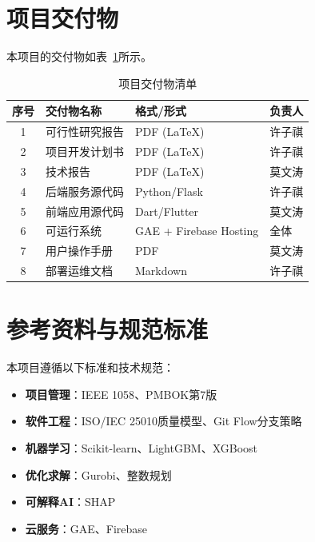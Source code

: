 \section{项目交付物}

本项目的交付物如表~\ref{tab:deliverables}所示。

\begin{table}[htbp]
    \centering
    \caption{项目交付物清单}
    \label{tab:deliverables}
    \begin{tabular}{clll}
        \toprule
        \textbf{序号} & \textbf{交付物名称} & \textbf{格式/形式}         & \textbf{负责人} \\
        \midrule
        1           & 可行性研究报告        & PDF (LaTeX)            & 许子祺          \\
        2           & 项目开发计划书        & PDF (LaTeX)            & 许子祺          \\
        3           & 技术报告           & PDF (LaTeX)            & 莫文涛          \\
        4           & 后端服务源代码        & Python/Flask           & 许子祺          \\
        5           & 前端应用源代码        & Dart/Flutter           & 莫文涛          \\
        6           & 可运行系统          & GAE + Firebase Hosting & 全体           \\
        7           & 用户操作手册         & PDF                    & 莫文涛          \\
        8           & 部署运维文档         & Markdown               & 许子祺          \\
        \bottomrule
    \end{tabular}
\end{table}

\section{参考资料与规范标准}

本项目遵循以下标准和技术规范：
\begin{itemize}[nosep]
    \item \textbf{项目管理}：IEEE 1058\cite{ieee1058}、PMBOK第7版\cite{pmbok2021}
    \item \textbf{软件工程}：ISO/IEC 25010质量模型、Git Flow分支策略
    \item \textbf{机器学习}：Scikit-learn\cite{pedregosa2011scikit}、LightGBM\cite{ke2017lightgbm}、XGBoost\cite{chen2016xgboost}
    \item \textbf{优化求解}：Gurobi\cite{gurobi2023}、整数规划\cite{wolsey1998integer}
    \item \textbf{可解释AI}：SHAP\cite{lundberg2017shap}
    \item \textbf{云服务}：GAE\cite{google2023gae}、Firebase\cite{firebase2023}
\end{itemize}


